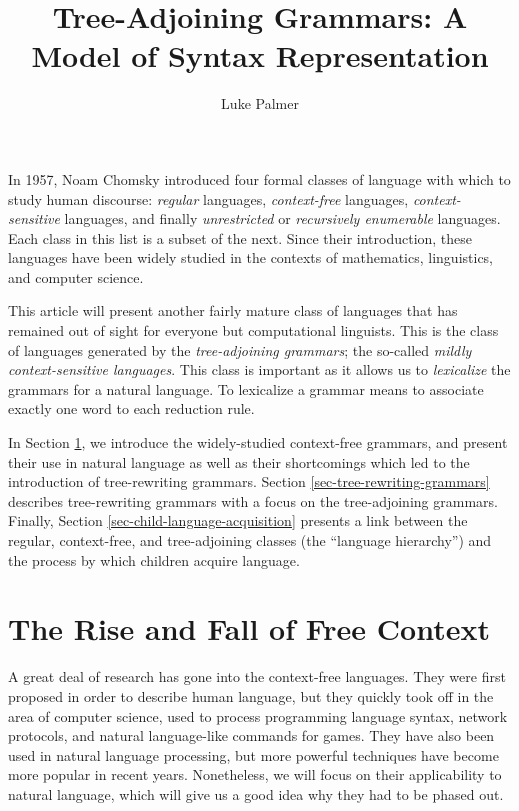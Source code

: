 \documentclass[12pt]{article}
\title{Tree-Adjoining Grammars: A Model of Syntax Representation}
\author{Luke Palmer}
\newcommand{\defn}[1]{\textit{#1}}
\begin{document}
\maketitle
\doublespace

In 1957, Noam Chomsky introduced four formal classes of language with
which to study human discourse:  \defn{regular} languages,
\defn{context-free} languages, \defn{context-sensitive} languages, and
finally \defn{unrestricted} or \defn{recursively enumerable} languages.
Each class in this list is a subset of the next.  Since their
introduction, these languages have been widely studied in the contexts
of mathematics, linguistics, and computer science.

This article will present another fairly mature class of languages that
has remained out of sight for everyone but computational linguists.
This is the class of languages generated by the \defn{tree-adjoining
grammars}; the so-called \defn{mildly context-sensitive languages}.
This class is important as it allows us to \defn{lexicalize} the
grammars for a natural language.  To lexicalize a grammar means to
associate exactly one word to each reduction rule.

In Section \ref{sec-free-context}, we introduce the widely-studied
context-free grammars, and present their use in natural language as well
as their shortcomings which led to the introduction of tree-rewriting
grammars.  Section \ref{sec-tree-rewriting-grammars} describes
tree-rewriting grammars with a focus on the tree-adjoining grammars.
Finally, Section \ref{sec-child-language-acquisition} presents a link
between the regular, context-free, and tree-adjoining classes (the
``language hierarchy'') and the process by which children acquire
language.

\section{The Rise and Fall of Free Context}
\label{sec-free-context}

A great deal of research has gone into the context-free languages.  They
were first proposed in order to describe human language, but they
quickly took off in the area of computer science, used to process
programming language syntax, network protocols, and natural
language-like commands for games.  They have also been used in natural
language processing, but more powerful techniques have become more
popular in recent years.  Nonetheless, we will focus on their
applicability to natural language, which will give us a good idea why
they had to be phased out.
\end{document}
